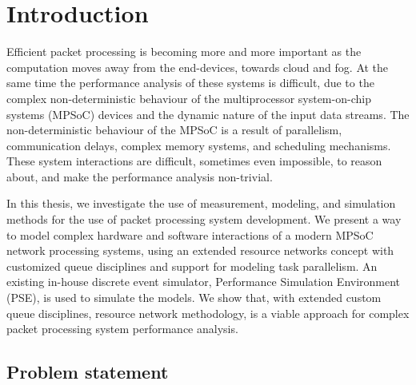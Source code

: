 \chapter{Introduction}
\label{chapter:intro}
Efficient packet processing is becoming more and more important as the computation moves away from the end-devices, towards cloud and fog. At the same time the performance analysis of these systems is difficult, due to the complex non-deterministic behaviour of the multiprocessor system-on-chip systems (MPSoC) devices and the dynamic nature of the input data streams. The non-deterministic behaviour of the MPSoC is a result of parallelism, communication delays, complex memory systems, and scheduling mechanisms. These system interactions are difficult, sometimes even impossible, to reason about, and make the performance analysis non-trivial.

In this thesis, we investigate the use of measurement, modeling, and simulation methods for the use of packet processing system development. We present a way to model complex hardware and software interactions of a modern MPSoC network processing systems, using an extended resource networks concept with customized queue disciplines and support for modeling task parallelism. An existing in-house discrete event simulator, Performance Simulation Environment (PSE), is used to simulate the models. We show that, with extended custom queue disciplines, resource network methodology, is a viable approach for complex packet processing system performance analysis.



\section{Problem statement}



